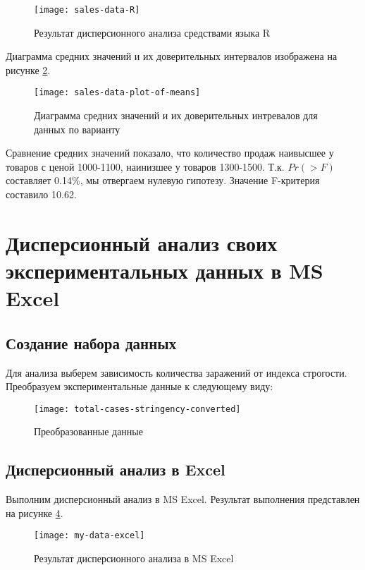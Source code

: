 \documentclass[a4paper,14pt]{extarticle}
\begin{document}
\begin{figure}[H]
    \centering
    \texttt{[image: sales-data-R]}
    \caption{Результат дисперсионного анализа средствами языка R}
    \label{fig:sales-data-R}
\end{figure}

Диаграмма средних значений и их доверительных интервалов изображена на рисунке
\ref{fig:sales-data-plot-of-means}.

\begin{figure}[H]
    \centering
    \texttt{[image: sales-data-plot-of-means]}
    \caption{Диаграмма средних значений и их доверительных интревалов для данных по варианту}
    \label{fig:sales-data-plot-of-means}
\end{figure}

Сравнение средних значений показало, что количество продаж наивысшее у товаров с
ценой 1000-1100, наинизшее у товаров 1300-1500. Т.к. $Pr(>F)$ составляет 0.14\%,
мы отвергаем нулевую гипотезу. Значение F-критерия составило 10.62.

\section{Дисперсионный анализ своих экспериментальных данных в MS Excel}
\subsection{Создание набора данных}
Для анализа выберем зависимость количества заражений от индекса строгости.
Преобразуем экспериментальные данные к следующему виду:

\begin{figure}[H]
    \centering
    \texttt{[image: total-cases-stringency-converted]}
    \caption{Преобразованные данные}
    \label{fig:total-cases-stringency-converted}
\end{figure}

\subsection{Дисперсионный анализ в Excel}
Выполним дисперсионный анализ в MS Excel. Результат выполнения представлен на
рисунке \ref{fig:my-data-excel}.

\begin{figure}[H]
    \centering
    \texttt{[image: my-data-excel]}
    \caption{Результат дисперсионного анализа в MS Excel}
    \label{fig:my-data-excel}
\end{figure}
\end{document}
